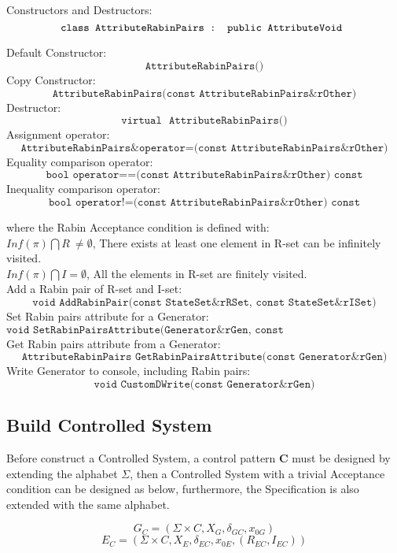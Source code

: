 \documentclass[
a4paper, 
12pt,
]{article}
\begin{document}
    Constructors and Destructors:
\[
\texttt{class AttributeRabinPairs : public AttributeVoid {}} \\
\]

Default Constructor:
\[
    \texttt{AttributeRabinPairs()}
\]
Copy Constructor:
\[
    \texttt{AttributeRabinPairs(const AttributeRabinPairs\& rOther)}
\]
Destructor:
\[
    \texttt{virtual ~AttributeRabinPairs()}
\]
Assignment operator:
\[
    \texttt{AttributeRabinPairs\& operator=(const AttributeRabinPairs\& rOther)}
\]
Equality comparison operator:
\[
    \texttt{bool operator==(const AttributeRabinPairs\& rOther) const}
\]
Inequality comparison operator:
\[
    \texttt{bool operator!=(const AttributeRabinPairs\& rOther) const}
\]
    
where the Rabin Acceptance condition is defined with: \\
$Inf(\pi)\bigcap R \ \neq \emptyset$, There exists at least one element in R-set can be infinitely visited.\\
$Inf(\pi)\bigcap I=\emptyset$, All the elements in R-set are finitely visited.\\

Add a Rabin pair of R-set and I-set:
\[
    \texttt{void AddRabinPair(const StateSet\& rRSet, const StateSet\& rISet)}
\]
Set Rabin pairs attribute for a Generator:
\[
    \texttt{void SetRabinPairsAttribute(Generator\& rGen, const AttributeRabinPairs\& rAttr)}
\]
Get Rabin pairs attribute from a Generator:
\[
    \texttt{AttributeRabinPairs GetRabinPairsAttribute(const Generator\& rGen)}
\]
Write Generator to console, including Rabin pairs:
\[
    \texttt{void CustomDWrite(const Generator\& rGen)}
\]


\subsection{Build Controlled System}
Before construct a Controlled System, a control pattern $\mathbf{C}$ must be designed by extending the alphabet $\varSigma $, then a Controlled System with a trivial Acceptance condition can be designed as below, furthermore, the Specification is also extended with the same alphabet.

\begin{equation}
    G_C=(\Sigma\times C, X_G, \delta _{GC} , x_{0G}) 
\end{equation}
\begin{equation}
    E_C=(\Sigma\times C, X_E, \delta _{EC} , x_{0E},(R_{EC},I_{EC})) 
\end{equation}
\end{document}
